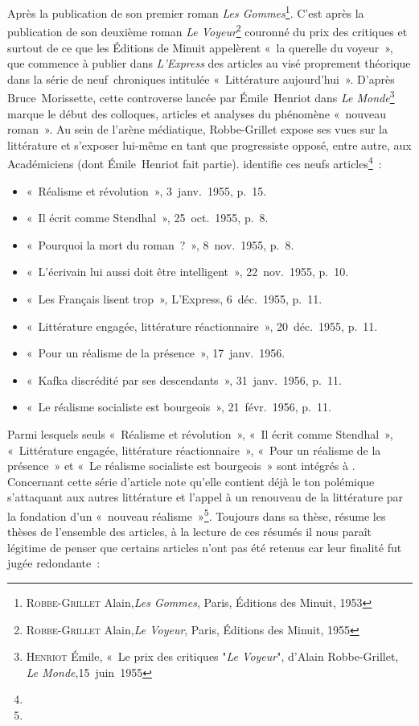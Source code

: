 \documentclass[12pt, a4paper]{article}
\begin{document}
Après la publication de son premier roman \textit{Les Gommes}\footnote{\textsc{Robbe-Grillet} Alain,\textit{Les Gommes}, Paris, Éditions des Minuit, 1953}. C'est après la publication de son deuxième roman \textit{Le Voyeur}\footnote{\textsc{Robbe-Grillet} Alain,\textit{Le Voyeur}, Paris, Éditions des Minuit, 1955} couronné du prix des critiques et surtout de ce que les Éditions de Minuit appelèrent «~la querelle du voyeur~», que \robbe{} commence à publier dans \textit{L'Express} des articles au visé proprement théorique dans la série de neuf~chroniques intitulée «~Littérature aujourd'hui~». D'après Bruce~Morissette, cette controverse lancée par Émile~Henriot dans \textit{Le Monde}\footnote{\textsc{Henriot} Émile, «~Le prix des critiques "\textit{Le Voyeur}", d'Alain Robbe-Grillet, \textit{Le Monde},15~juin~1955} marque le début des colloques, articles et analyses du phénomène «~nouveau roman~». Au sein de l'arène médiatique, Robbe-Grillet expose ses vues sur la littérature et s'exposer lui-même en tant que progressiste opposé, entre autre, aux Académiciens (dont Émile~Henriot fait partie). \galia{} identifie ces neufs articles\footnote{}~:
\begin{itemize}
    \item «~Réalisme et révolution~», 3~janv.~1955, p.~15.%
    \item «~Il écrit comme Stendhal~», 25~oct.~1955, p.~8.%
    \item «~Pourquoi la mort du roman~?~», 8~nov.~1955, p.~8.%
    \item «~L’écrivain lui aussi doit être intelligent~», 22~nov.~1955, p.~10.%
    \item «~Les Français lisent trop~», L’Express, 6~déc.~1955, p.~11.%
    \item «~Littérature engagée, littérature réactionnaire~», 20~déc.~1955, p.~11.%
    \item «~Pour un réalisme de la présence~», 17~janv.~1956.%
    \item «~Kafka discrédité par ses descendants~», 31~janv.~1956, p.~11.%
    \item «~Le réalisme socialiste est bourgeois~», 21~févr.~1956, p.~11.%
\end{itemize}
Parmi lesquels seuls «~Réalisme et révolution~», «~Il écrit comme Stendhal~», «~Littérature engagée, littérature réactionnaire~», «~Pour un réalisme de la présence~» et «~Le réalisme socialiste est bourgeois~» sont intégrés à \punr. Concernant cette série d'article \galia{} note qu'elle contient déjà le ton polémique s'attaquant aux autres littérature et l'appel à un renouveau de la littérature par la fondation d'un «~nouveau réalisme~»\footnote{}. Toujours dans sa thèse, \galia{} résume les thèses de l'ensemble des articles, à la lecture de ces résumés il nous paraît légitime de penser que certains articles n'ont pas été retenus car leur finalité fut jugée redondante~:
\end{document}
